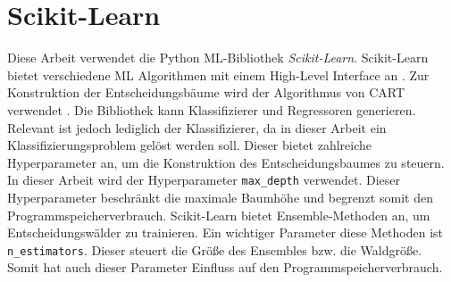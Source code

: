 \section{Scikit-Learn}
\label{sec:dt_scikit_learn}
Diese Arbeit verwendet die Python ML-Bibliothek \textit{Scikit-Learn}. Scikit-Learn bietet verschiedene ML Algorithmen mit einem High-Level Interface an \cite{scikit-learn}.
Zur Konstruktion der Entscheidungsbäume wird der Algorithmus von CART verwendet \cite{ScikitLearnCART}.
Die Bibliothek kann Klassifizierer und Regressoren generieren.
\newline
\newline
Relevant ist jedoch lediglich der Klassifizierer, da in dieser Arbeit ein Klassifizierungsproblem gelöst werden soll. Dieser bietet zahlreiche Hyperparameter an, um die Konstruktion des
Entscheidungsbaumes zu steuern. In dieser Arbeit wird der Hyperparameter \texttt{max\_depth} verwendet. Dieser Hyperparameter beschränkt die maximale Baumhöhe und begrenzt somit
den Programmspeicherverbrauch.
\newline
\newline
Scikit-Learn bietet Ensemble-Methoden an, um Entscheidungswälder zu trainieren. Ein wichtiger Parameter diese Methoden ist \texttt{n\_estimators}. Dieser steuert die Größe des Ensembles bzw.
die Waldgröße. Somit hat auch dieser Parameter Einfluss auf den Programmspeicherverbrauch.